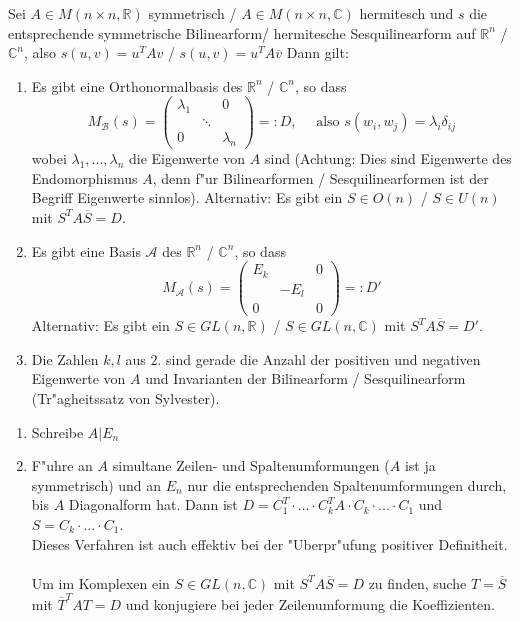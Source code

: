\documentclass[9pt, a4paper, twocolumn, landscape]{article}
\begin{document}
\begin{theorem} 
Sei  $A \in M (n \times n, \mathbb{R} )$ symmetrisch / $A \in M (n \times n, \mathbb{C} )$ hermitesch und  $s$ die entsprechende symmetrische Bilinearform/ hermitesche Sesquilinearform auf $\mathbb{R}^n$ / $ \mathbb{C}^n$, also $s(u, v) = u^T A v$ / $s(u, v) = u^T A \overline{v}$ Dann gilt:
\begin{enumerate}
\item Es gibt eine Orthonormalbasis des $\mathbb{R}^n$ / $\mathbb{C}^n$, so dass 
$$
M_\mathcal{B}(s) = \left(\begin{array}{ccc}\lambda_{1} & & 0 
\\ & \ddots & 
\\ 0 & & \lambda_{n}\end{array}\right) =:D, \quad \text{ also } s(w_i, w_j) = \lambda_i \delta_{ij}
$$
wobei $\lambda_1, ..., \lambda_n$ die Eigenwerte von $A$ sind (Achtung: Dies sind Eigenwerte des Endomorphismus $A$, denn f"ur Bilinearformen / Sesquilinearformen ist der Begriff Eigenwerte sinnlos).
Alternativ: Es gibt ein $S \in O(n)$ / $S \in U(n)$ mit $S^T A \overline{S} = D$.
\item Es gibt eine Basis $\mathcal{A}$ des  $\mathbb{R}^n$ / $\mathbb{C}^n$, so dass
$$
M_\mathcal{A}(s) =  \left(\begin{array}{ccc}E_k & & 0 
\\ & -E_l & 
\\ 0 & & 0\end{array}\right) =: D' 
$$
Alternativ: Es gibt ein $S \in GL(n, \mathbb{R})$ / $S \in GL(n, \mathbb{C})$ mit $S^T A \overline{S} = D'$.
\item Die Zahlen $k, l$ aus $2.$ sind gerade die Anzahl der positiven und negativen Eigenwerte von $A$ und Invarianten der Bilinearform / Sesquilinearform (Tr"agheitssatz von Sylvester).
\end{enumerate}
\end{theorem}

\begin{remark} 
\begin{enumerate}
\item Schreibe $A | E_n$
\item F"uhre an $A$ simultane Zeilen- und Spaltenumformungen ($A$ ist ja symmetrisch) und an $E_n$ nur die entsprechenden Spaltenumformungen durch, bis $A$ Diagonalform hat. Dann ist $D = C_1^T \cdot ... \cdot C_k^T A \cdot C_k \cdot ... \cdot C_1$ und $S = C_k \cdot ... \cdot C_1$.
\\ Dieses Verfahren ist auch effektiv bei der "Uberpr"ufung positiver Definitheit.
\\
\\
Um im Komplexen ein $S \in GL(n, \mathbb{C})$ mit $S^T A \overline{S} = D$ zu finden, suche $T = \overline{S}$ mit $\overline{T}^T A T = D$ und konjugiere bei jeder Zeilenumformung die Koeffizienten.
\end{enumerate}
\end{remark}
\end{document}
